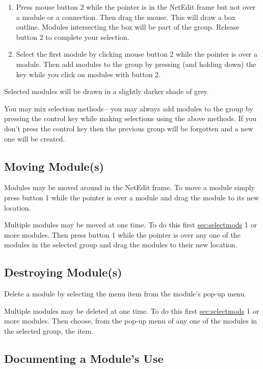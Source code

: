 \begin{enumerate}
\item Press mouse button 2 while the pointer is in the NetEdit frame but not over
a module or a connection.  Then drag the mouse.  This will draw a box
outline.  Modules intersecting the box will be part of the group.  Release
button 2 to complete your selection.
\item Select the first module by clicking mouse button 2 while the pointer is
over a module.  Then add modules to the group by pressing (and holding
down) the  key while you click on modules with button 2.
\end{enumerate}

Selected modules will be drawn in a slightly darker shade of grey.

You may mix selection methods---you may always add modules to the group by
pressing the control key while making selections using the above methods.
If you don't press the control key then the previous group will be
forgotten and a new one will be created.

\subsection{Moving Module(s)}
\label{sec:movemod}

Modules may be moved around in the NetEdit frame.  To move a module simply
press button 1 while the pointer is over a module and drag the module to
its new location.

Multiple modules may be moved at one time.  To do this first
\hyperref{select}{select (see Section~}{)}{sec:selectmods} 1 or more
modules. Then press button 1 while the pointer is over any one of the
modules in the selected group and drag the modules to their new location.


\subsection{Destroying Module(s)}
\label{sec:destroymod}

Delete a module by selecting the  menu item from the
module's pop-up menu.

Multiple modules may be deleted at one time.  To do this first
\hyperref{select}{select (see Section~}{)}{sec:selectmods} 1 or more
modules. Then choose, from the pop-up menu of any one of the modules in the
selected group, the  item.


\subsection{Documenting a Module's Use}
\label{sec:docmodule}


